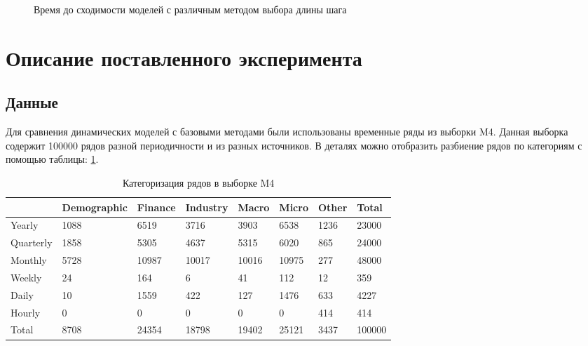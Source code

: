 \documentclass[a4paper,14pt]{extarticle}
\begin{document}
\begin{enumerate}
\begin{figure}[!h]
			\caption{Время до сходимости моделей с различным методом выбора длины шага}
			\label{hyper:lr_finder}
		\end{figure}
	\end{enumerate}
\section{Описание поставленного эксперимента}
	\subsection{Данные}
	Для сравнения динамических моделей с базовыми методами были использованы временные ряды из выборки M4. Данная выборка содержит 100000 рядов разной периодичности и из разных источников. В деталях можно отобразить разбиение рядов по категориям с помощью таблицы: \ref{exp:m4}.
	\begin{table}[!h]
		\captionsetup{justification=centering}
		\centering
		\caption{Категоризация рядов в выборке M4}
		\begin{tabular}{llllllll}
			\hline 
			 & Demographic & Finance & Industry & Macro & Micro & Other & Total\\
			\hline 
			Yearly & 1088 & 6519 & 3716 & 3903 & 6538 & 1236 & 23000\\
			Quarterly & 1858 & 5305 & 4637 & 5315 & 6020 & 865 & 24000\\
			Monthly & 5728 & 10987 & 10017 & 10016 & 10975 & 277 & 48000\\
			Weekly & 24 & 164 & 6 & 41 & 112 & 12 & 359\\
			Daily & 10 & 1559 & 422 & 127 & 1476 & 633 & 4227\\
			Hourly & 0 & 0 & 0 & 0 & 0 & 414 & 414\\
			Total & 8708 & 24354 & 18798 & 19402 & 25121 & 3437 & 100000\\
			\hline
		\end{tabular}
		\label{exp:m4}
	\end{table}
\end{document}
